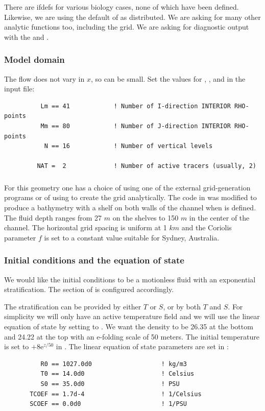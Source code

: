 There are ifdefs for various biology cases, none of which
have been defined. Likewise, we are using the default of
 as distributed. We are asking for many other
analytic functions too, including the grid. We are asking
for diagnostic output with the  and
.

\subsubsection{Model domain}
The flow does not vary in $x$, so  can be small.
Set the values for , ,  and  in
the input file:
\begin{verbatim}
          Lm == 41            ! Number of I-direction INTERIOR RHO-points
          Mm == 80            ! Number of J-direction INTERIOR RHO-points
           N == 16            ! Number of vertical levels

         NAT =  2             ! Number of active tracers (usually, 2)
\end{verbatim}

\subsubsection{}
For this geometry one has a choice of using one of the external
grid-generation programs or of using  to create the grid
analytically. The code in  was modified to produce a
bathymetry with a shelf on both walls of the channel when 
is defined. The fluid depth ranges from 27 $m$ on the shelves to 150 $m$
in the center of the channel.  The horizontal grid spacing is uniform
at 1 $km$ and the Coriolis parameter $f$ is set to a constant value
suitable for Sydney, Australia.

\subsubsection{Initial conditions and the equation of state}
We would like the initial conditions to be a motionless fluid with an
exponential stratification. The  section of
 is configured accordingly.

The stratification can be provided by either $T$ or $S$, or by both
$T$ and $S$.  For
simplicity we will only have an active temperature field and we will
use the linear equation of state by setting  to
. We want the density to be 26.35 at
the bottom and 24.22 at the top with an e-folding scale of 50 meters.
The initial temperature is set to $ + 8\mbox{e}^{z/50}$ in
.  The linear equation of state parameters are set
in :
\begin{verbatim}
          R0 == 1027.0d0                   ! kg/m3
          T0 == 14.0d0                     ! Celsius
          S0 == 35.0d0                     ! PSU
       TCOEF == 1.7d-4                     ! 1/Celsius
       SCOEF == 0.0d0                      ! 1/PSU
\end{verbatim}

